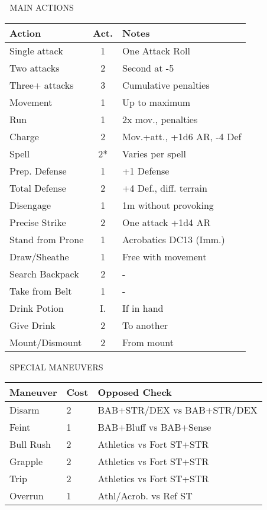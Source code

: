 \documentclass[10pt,a4paper,landscape]{article}
\begin{document}
\begin{multicols}{4}
		\begin{mainsection}{📜 MAIN ACTIONS}
			{\small
				\begin{tabular}{@{}p{2cm}cp{3cm}@{}}
					\toprule
					\textbf{Action} & \textbf{Act.} & \textbf{Notes} \\
					\midrule
					Single attack & 1 & One Attack Roll \\
					Two attacks & 2 & Second at -5 \\
					Three+ attacks & 3 & Cumulative penalties \\
					\midrule
					Movement & 1 & Up to maximum \\
					Run & 1 & 2x mov., penalties \\
					Charge & 2 & Mov.+att., +1d6 AR, -4 Def \\
					\midrule
					Spell & 2* & Varies per spell \\
					Prep. Defense & 1 & +1 Defense \\
					Total Defense & 2 & +4 Def., diff. terrain \\
					Disengage & 1 & 1m without provoking \\
					Precise Strike & 2 & One attack +1d4 AR \\
					\midrule
					Stand from Prone & 1 & Acrobatics DC13 (Imm.) \\
					Draw/Sheathe & 1 & Free with movement \\
					Search Backpack & 2 & - \\
					Take from Belt & 1 & - \\
					\midrule
					Drink Potion & I. & If in hand \\
					Give Drink & 2 & To another \\
					Mount/Dismount & 2 & From mount \\
					\bottomrule
				\end{tabular}
			}
		\end{mainsection}
		
		\begin{mainsection}{🤺 SPECIAL MANEUVERS}
			\begin{tabular}{@{}p{1.7cm}p{0.8cm}p{3cm}@{}}
				\toprule
				\textbf{Maneuver} & \textbf{Cost} & \textbf{Opposed Check} \\
				\midrule
				Disarm & 2 & BAB+STR/DEX vs BAB+STR/DEX \\
				Feint & 1 & BAB+Bluff vs BAB+Sense \\
				Bull Rush & 2 & Athletics vs Fort ST+STR \\
				Grapple & 2 & Athletics vs Fort ST+STR \\
				Trip & 2 & Athletics vs Fort ST+STR \\
				Overrun & 1 & Athl/Acrob. vs Ref ST \\
				\bottomrule
			\end{tabular}
			

\end{mainsection}
\end{multicols}
\end{document}
